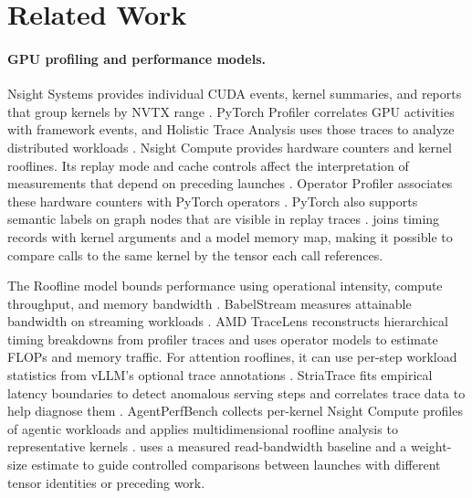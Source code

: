 \section{Related Work}\label{sec:related}

\paragraph{GPU profiling and performance models.}
Nsight Systems provides individual CUDA events, kernel summaries, and
reports that group kernels by NVTX range
\cite{nvidiaNsightSystems}. PyTorch Profiler correlates GPU activities
with framework events, and Holistic Trace Analysis uses those traces
to analyze distributed workloads \cite{pytorchProfiler,pytorchHta}.
Nsight Compute provides hardware counters and kernel rooflines. Its
replay mode and cache controls affect the interpretation of measurements
that depend on preceding launches \cite{nvidiaNsightCompute}. Operator
Profiler associates these hardware counters with PyTorch operators
\cite{chu2026operator}. PyTorch also supports semantic labels on graph
nodes that are visible in replay traces \cite{pytorchGraphAnnotations}.
\sys{} joins timing records with kernel arguments and a model memory
map, making it possible to compare calls to the same kernel by the
tensor each call references.

The Roofline model bounds performance using operational intensity,
compute throughput, and memory bandwidth \cite{williams2009roofline}.
BabelStream measures attainable bandwidth on streaming workloads
\cite{deakin2016babelstream}. AMD TraceLens reconstructs hierarchical
timing breakdowns from profiler traces and uses operator models to
estimate FLOPs and memory traffic. For attention rooflines, it can use
per-step workload statistics from vLLM's optional trace annotations
\cite{amdTracelens,vllmRooflineAnnotations}. StriaTrace fits empirical
latency boundaries to detect anomalous serving steps and correlates
trace data to help diagnose them \cite{wu2026striatrace}. AgentPerfBench
collects per-kernel Nsight Compute profiles of agentic workloads and
applies multidimensional roofline analysis to representative kernels
\cite{lau2026agentperfbench}.
\sys{} uses a measured read-bandwidth baseline and a weight-size
estimate to guide controlled comparisons between launches with
different tensor identities or preceding work.

